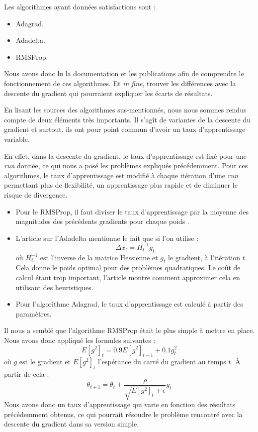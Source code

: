 \documentclass[a4paper, 11pt]{article}
\begin{document}
Les algorithmes ayant données satisfactions sont \cite{keras}:
\begin{itemize}
 \item Adagrad.
 \item Adadelta.
 \item RMSProp.
\end{itemize}

  Nous avons donc lu la documentation et les publications afin de comprendre le fonctionnement de ces algorithmes. Et \textit{in fine}, trouver les 
  différences avec la descente du gradient qui pourraient expliquer les écarts de résultats.
  
  En lisant les sources des algorithmes sus-mentionnés, nous nous sommes rendus compte de deux éléments très importants. Il s'agît de variantes de la
  descente du gradient et surtout, ils ont pour point commun d'avoir un taux d'apprentissage variable.
  
  En effet, dans la descente du gradient, le taux d'apprentissage est fixé pour une \textit{run} donnée, ce qui nous a posé les problèmes expliqués précédemment.
  Pour ces algorithmes, le taux d'apprentissage est modifié à chaque itération d'une \textit{run} permettant plus de flexibilité, un apprentissage plus 
  rapide et de diminuer le risque de divergence.
  \begin{itemize}
   \item Pour le RMSProp, il faut diviser le taux d'apprentissage par la moyenne des magnitudes des précédents gradients pour chaque poids \cite{rmsprop}.
   \item L'article sur l'Adadelta mentionne le fait que si l'on utilise \cite{adadelta}:
   $$\Delta x_t = H_t^{-1}g_t$$
   où $H_t^{-1}$ est l'inverse de la matrice Hessienne et $g_t$ le gradient, à l'itération $t$. Cela donne le poids optimal pour des problèmes quadratiques.
   Le coût de calcul étant trop important, l'article montre comment approximer cela en utilisant des heuristiques.
   \item Pour l'algorithme Adagrad, le taux d'apprentissage est calculé à partir des paramètres.
  \end{itemize}

  Il nous a semblé que l'algorithme RMSProp était le plus simple à mettre en place. Nous avons donc appliqué les formules suivantes \cite{rmsprop_algo} :
  $$E[g^2]_t = 0.9 E[g^2]_{t-1} + 0.1 g^2_t$$
  où $g$ est le gradient et $E[g^2]_t$ l'espérance du carré du gradient au temps $t$. À partir de cela :
  $$\theta_{t+1} = \theta_t + \frac{\rho}{\sqrt{E[g^2]_t + \epsilon}} g_t$$
  Nous avons donc un taux d'apprentissage qui varie en fonction des résultats précédemment obtenus, ce qui pourrait résoudre le problème rencontré avec la
  descente du gradient dans sa version simple.
  
\end{document}
